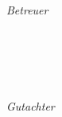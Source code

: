 \begin{titlepage}
	\vfill
	\begin{minipage}[t]{.27\textwidth}
		\raggedleft
		\textit{Betreuer}
	\end{minipage}
	\hspace*{15pt}
	\begin{minipage}[t]{.65\textwidth}
		{\large \thesisFirstReviewer} \\
	  	{\small \thesisFirstReviewerDepartment} \\[-1mm]
		{\small \thesisFirstReviewerUniversity}
	\end{minipage} \\[5mm]
\begin{minipage}[t]{.27\textwidth}
	\raggedleft
	\textit{Gutachter}
\end{minipage}
\hspace*{15pt}
\begin{minipage}[t]{.65\textwidth}
	{\large \thesisSecondReviewer} \\
	{\small \thesisSecondReviewerDepartment} \\[-1mm]
	{\small \thesisSecondReviewerUniversity}
	
\end{minipage} \\[5mm]
	\thesisDate \\
\end{titlepage}